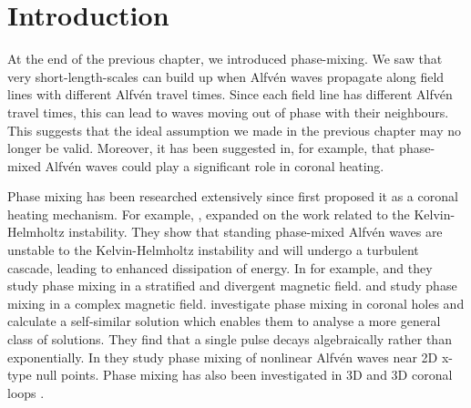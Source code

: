 \section{Introduction}
\label{sec:chap_3_introduction}

At the end of the previous chapter, we introduced phase-mixing. We saw that very short-length-scales can build up when Alfv\'en waves propagate along field lines with different Alfv\'en travel times. Since each field line has different Alfv\'en travel times, this can lead to waves moving out of phase with their neighbours. This suggests that the ideal assumption we made in the previous chapter may no longer be valid. Moreover, it has been suggested in, for example, \citet{Heyvaerts1983} that phase-mixed Alfv\'en waves could play a significant role in coronal heating.

Phase mixing has been researched extensively since \citet{Heyvaerts1983} first proposed it as a coronal heating mechanism. For example, \citet{Browning1984}, expanded on the \citet{Heyvaerts1983} work related to the Kelvin-Helmholtz instability. They show that standing phase-mixed Alfv\'en waves are unstable to the Kelvin-Helmholtz instability and will undergo a turbulent cascade, leading to enhanced dissipation of energy. In for example, \citet{DeMoortel2002} and \citet{Smith2007} they study phase mixing in a stratified and divergent magnetic field. \citet{Similon1989} and \citet{Howson2019} study phase mixing in a complex magnetic field. \citet{Hood1997,Hood2002} investigate phase mixing in coronal holes and calculate a self-similar solution which enables them to analyse a more general class of solutions. They find that a single pulse decays algebraically rather than exponentially. In \citet{McLaughlin2011a,McLaughlin2013,Prokopyszyn2019a} they study phase mixing of nonlinear Alfv\'en waves near 2D x-type null points. Phase mixing has also been investigated in 3D \citep{Magyar2017} and 3D coronal loops \citep{Pagano2017,Pagano2018}.

